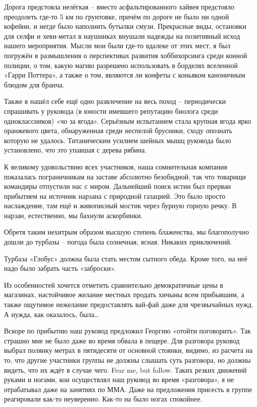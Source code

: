 Дорога предстояла нелёгкая – вместо асфальтированного хайвея предстояло преодолеть где-то 5 км по грунтовке, причём по дороге не было ни одной кофейни, и негде было наполнить бутылки смузи.
Прекрасные виды, остановки для селфи и хеви-метал в наушниках внушали надежды на позитивный исход нашего мероприятия. Мысли мои были где-то вдалеке от этих мест, я был погружён в размышления о перспективах развития хоббихорсинга среди конной полиции, о том, какую магию разрешено использовать в борделях вселенной «Гарри Поттера», а также о том, являются ли конфеты с коньяком каноничным блюдом для бранча.

Также я нашёл себе ещё одно развлечение на весь поход – периодически спрашивать у руковода (в юности имевшего репутацию биолога среди одноклассников) «чо за ягода». Серьёзным испытанием стала крупная ягода ярко оранжевого цвета, обнаруженная среди неспелой брусники, сходу опознать которую не удалось. Титаническим усилием шейных мышц руковода было установлено, что это упавшая с дерева рябина.

К великому удовольствию всех участников, наша сомнительная компания показалась пограничникам на заставе абсолютно безобидной, так что товарищи командиры отпустили нас с миром. 
Дальнейший поиск истин был прерван прибытием на источник нарзана с природной газацией. Это было просто наслаждение, там ещё и живописный мостик через бурную горную речку. В нарзан, естественно, мы бахнули аскорбинки.

Обретя таким нехитрым образом высшую степень блаженства, мы благополучно дошли до турбазы – погода была солнечная, ясная. Никаких приключений.

Турбаза «Глобус» должна была стать местом сытного обеда. Кроме того, на неё надо было забрать часть «заброски». 

Из особенностей хочется отметить сравнительно демократичные цены в магазинах, настойчивое желание местных продать хичыны всем прибывшим, а также ощутимое нежелание предоставлять вай-фай даже для чрезвычайных нужд. А нужда, как оказалось, была…

Вскоре по прибытию наш руковод предложил Георгию «отойти поговорить». Так страшно мне не было даже во время обвала в пещере. Для разговора руковод выбрал полянку метрах в пятидесяти от основной стоянки, видимо, из расчета на то, что другие участники группы не должны слышать суть разговора, но должны видеть, что их ждёт в случае чего. Fear me, but follow.
Таких резких движений руками и ногами, кои осуществлял наш руковод во время «разговора», я не отрабатывал даже на занятиях по ММА. Даже на предложения присесть в группе реагировали как-то неуверенно. Как-то на было ногах спокойнее.

